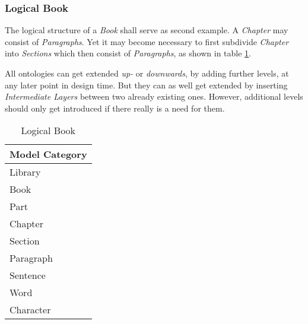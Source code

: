 %
%
%
%
%
%
%

\subsubsection{Logical Book}
\label{logical_book_heading}

The logical structure of a \emph{Book} shall serve as second example. A
\emph{Chapter} may consist of \emph{Paragraphs}. Yet it may become necessary to
first subdivide \emph{Chapter} into \emph{Sections} which then consist of
\emph{Paragraphs}, as shown in table \ref{book_table}.

All ontologies can get extended \emph{up-} or \emph{downwards}, by adding
further levels, at any later point in design time. But they can as well get
extended by inserting \emph{Intermediate Layers} between two already existing
ones. However, additional levels should only get introduced if there really is
a need for them.

\begin{table}[ht]
    \begin{center}
        \begin{footnotesize}
        \begin{tabular}{| p{105mm} |}
            \hline
            \textbf{Model Category}\\
            \hline
            Library\\
            \hline
            Book\\
            \hline
            Part\\
            \hline
            Chapter\\
            \hline
            Section\\
            \hline
            Paragraph\\
            \hline
            Sentence\\
            \hline
            Word\\
            \hline
            Character\\
            \hline
        \end{tabular}
        \end{footnotesize}
        \caption{Logical Book}
        \label{book_table}
    \end{center}
\end{table}

